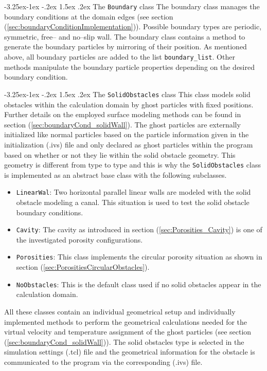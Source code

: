 \documentclass[11pt,a4paper,twoside]{report}
\makeatletter
\renewcommand\paragraph{\@startsection{paragraph}{4}{\z@}%
  {-3.25ex\@plus -1ex \@minus -.2ex}%
  {1.5ex \@plus .2ex}%
  {\normalfont\normalsize\bfseries}}
\makeatother
\begin{document}
\paragraph{The {\tt Boundary} class} 
The boundary class manages the boundary conditions at the domain edges (see section (\ref{sec:boundaryConditionImplementation})). Possible boundary types are periodic, symmetric, free-- and no--slip wall. The boundary class contains a method to generate the boundary particles by mirroring of their position. As mentioned above, all boundary particles are added to the list {\tt boundary\_list}. Other methods manipulate the boundary particle properties depending on the desired boundary condition. 
 

\paragraph{The {\tt SolidObstacles} class}
This class models solid obstacles within the calculation domain by ghost particles with fixed positions. Further details on the employed surface modeling methods can be found in section (\ref{sec:boundaryCond_solidWall}). The ghost particles are externally initialized like normal particles based on the particle information given in the initialization (.ivs) file and only declared as ghost particles within the program based on whether or not they lie within the solid obstacle geometry. This geometry is different from type to type and this is why the {\tt SolidObstacles} class is implemented as an abstract base class with the following subclasses.
\begin{itemize}
 \item {\tt LinearWal}: Two horizontal parallel linear walls are modeled with the solid obstacle modeling a canal. This situation is used to test the solid obstacle boundary conditions.
\item {\tt Cavity}: The cavity as introduced in section (\ref{sec:Porosities_Cavity}) is one of the investigated porosity configurations.
\item {\tt Porosities}: This class implements the circular porosity situation as shown in section (\ref{sec:PorositiesCircularObstacles}).
\item {\tt NoObstacles}: This is the default class used if no solid obstacles appear in the calculation domain.
\end{itemize}
All these classes contain an individual geometrical setup and individually implemented methods to perform the geometrical calculations needed for the virtual velocity and temperature assignment of the ghost particles (see section (\ref{sec:boundaryCond_solidWall})).
The solid obstacles type is selected in the simulation settings (.tcl) file and the geometrical information for the obstacle is communicated to the program via the corresponding (.ivs) file.
\end{document}
